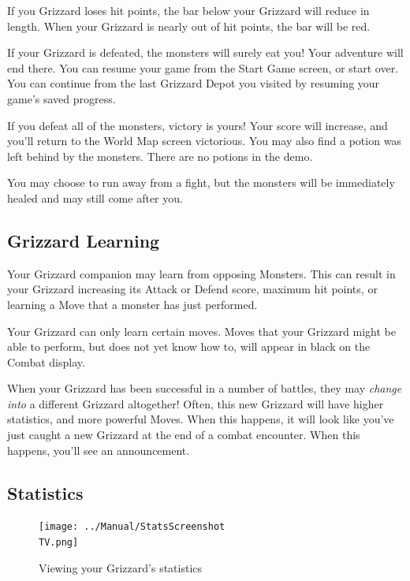 \documentclass[10pt,twocolumn,openany,article]{memoir}
\newcommand\TV{NTSC}
\newcommand\TV{PAL}
\newcommand\TV{SECAM}
\begin{document}
If  you Grizzard  loses hit  points, the  bar below  your Grizzard  will
reduce in  length. When your Grizzard  is nearly out of  hit points, the
bar will be red.

If  your  Grizzard  is  defeated,  the monsters  will  surely  eat  you!
Your adventure  will end  there. \ifdefined\NOSAVE  You can  resume your
game from the  Start Game screen, or start over.  \else You can continue
from the last  Grizzard Depot you visited by resuming  your game's saved
progress. \fi

If you  defeat all of  the monsters, victory  is yours! Your  score will
increase, and you'll return to the  World Map screen victorious. You may
also find a potion was left behind by the monsters. \ifdefined\DEMO\else
There are no potions in the demo. \fi

You  may choose  to run  away from  a fight,  but the  monsters will  be
immediately healed and may still come after you.

\subsection{Grizzard Learning}

Your  Grizzard companion  may  learn from  opposing  Monsters. This  can
result in your  Grizzard increasing its Attack or  Defend score, maximum
hit points, or learning a Move that a monster has just performed.

Your Grizzard  can only  learn certain moves.  Moves that  your Grizzard
might be able to  perform, but does not yet know how  to, will appear in
black on the Combat display.

When your Grizzard has been successful  in a number of battles, they may
\emph{change  into} a  different  Grizzard altogether!  Often, this  new
Grizzard  will   have  higher  statistics,  and   more  powerful  Moves.
\ifdefined\DEMO When this happens, it  will look like you've just caught
a  new Grizzard  at  the end  of  a combat  encounter.  \else When  this
happens, you'll see an announcement. \fi

\subsection{Statistics}

\begin{figure}[t]
  \texttt{[image: ../Manual/StatsScreenshot\\TV.png]}
  \caption{Viewing your Grizzard's statistics}
\end{figure}
\end{document}

